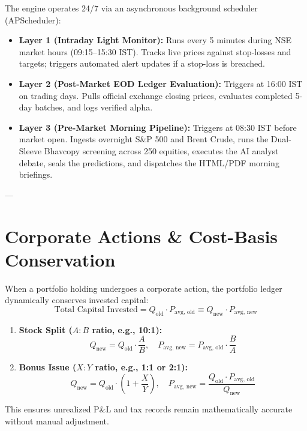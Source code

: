 \documentclass[11pt,a4paper]{article}
\begin{document}
The engine operates 24/7 via an asynchronous background scheduler (APScheduler):
\begin{itemize}
    \item \textbf{Layer 1 (Intraday Light Monitor):} Runs every 5 minutes during NSE market hours (09:15--15:30 IST). Tracks live prices against stop-losses and targets; triggers automated alert updates if a stop-loss is breached.
    \item \textbf{Layer 2 (Post-Market EOD Ledger Evaluation):} Triggers at 16:00 IST on trading days. Pulls official exchange closing prices, evaluates completed 5-day batches, and logs verified alpha.
    \item \textbf{Layer 3 (Pre-Market Morning Pipeline):} Triggers at 08:30 IST before market open. Ingests overnight S\&P 500 and Brent Crude, runs the Dual-Sleeve Bhavcopy screening across 250 equities, executes the AI analyst debate, seals the predictions, and dispatches the HTML/PDF morning briefings.
\end{itemize}

---

\section{Corporate Actions \& Cost-Basis Conservation}

When a portfolio holding undergoes a corporate action, the portfolio ledger dynamically conserves invested capital:
\begin{equation}
\text{Total Capital Invested} = Q_{\text{old}} \cdot P_{\text{avg, old}} \equiv Q_{\text{new}} \cdot P_{\text{avg, new}}
\end{equation}

\begin{enumerate}
    \item \textbf{Stock Split ($A:B$ ratio, e.g., 10:1):}
    \begin{equation}
    Q_{\text{new}} = Q_{\text{old}} \cdot \frac{A}{B}, \quad P_{\text{avg, new}} = P_{\text{avg, old}} \cdot \frac{B}{A}
    \end{equation}
    \item \textbf{Bonus Issue ($X:Y$ ratio, e.g., 1:1 or 2:1):}
    \begin{equation}
    Q_{\text{new}} = Q_{\text{old}} \cdot \left(1 + \frac{X}{Y}\right), \quad P_{\text{avg, new}} = \frac{Q_{\text{old}} \cdot P_{\text{avg, old}}}{Q_{\text{new}}}
    \end{equation}
\end{enumerate}
This ensures unrealized P\&L and tax records remain mathematically accurate without manual adjustment.
\end{document}
